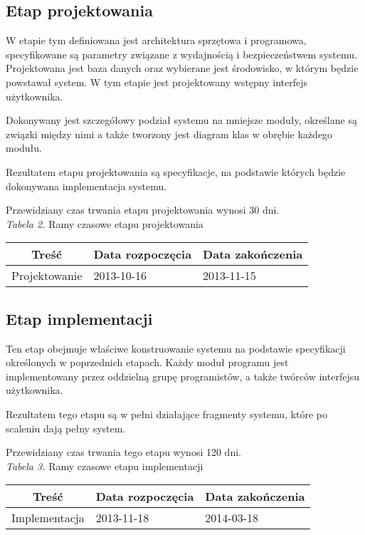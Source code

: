 \documentclass 	[11pt, a4paper, leqno]	{article}					%
\begin{document}
\subsection{Etap projektowania}
\noindent
W etapie tym definiowana jest architektura sprzętowa i programowa, specyfikowane są parametry związane z wydajnością i bezpieczeństwem systemu. Projektowana jest baza danych oraz wybierane jest środowisko, w którym będzie powstawał system. W tym etapie jest projektowany wstępny interfejs użytkownika. 

Dokonywany jest szczegółowy podział systemu na mniejsze moduły, określane są związki między nimi a także tworzony jest diagram klas w obrębie każdego modułu.

Rezultatem etapu projektowania są specyfikacje, na podstawie których będzie dokonywana implementacja systemu. 

Przewidziany czas trwania etapu projektowania wynosi 30 dni. \\

\textit{Tabela 2.} Ramy czasowe etapu projektowania

\begin{center}
	\begin{tabular}{| l | l | l |}
		\hline
		\multicolumn{1}{|c|}{Treść} & 
		\multicolumn{1}{|c|}{Data rozpoczęcia} & 
		\multicolumn{1}{|c|}{Data zakończenia} \\ \hline \hline
		Projektowanie & 2013-10-16 & 2013-11-15 \\ \hline
	\end{tabular}
\end{center}

\subsection{Etap implementacji}
\noindent
Ten etap obejmuje właściwe konstruowanie systemu na podstawie specyfikacji określonych w poprzednich etapach. Każdy moduł programu jest implementowany przez oddzielną grupę programistów, a także twórców interfejsu użytkownika. 

Rezultatem tego etapu są w pełni działające fragmenty systemu, które po scaleniu dają pełny system.

Przewidziany czas trwania tego etapu wynosi 120 dni. \\

\textit{Tabela 3.} Ramy czasowe etapu implementacji

\begin{center}
	\begin{tabular}{| l | l | l |}
		\hline
		\multicolumn{1}{|c|}{Treść} & 
		\multicolumn{1}{|c|}{Data rozpoczęcia} & 
		\multicolumn{1}{|c|}{Data zakończenia} \\ \hline \hline
		Implementacja & 2013-11-18 & 2014-03-18 \\ \hline
	\end{tabular}
\end{center}
\end{document}
